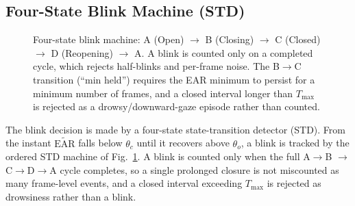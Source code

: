 \documentclass{IEEE_lsens}
\begin{document}
\subsection{Four-State Blink Machine (STD)}
\begin{figure}[!t]
\centering
{}
\caption{Four-state blink machine:
A (Open) $\rightarrow$ B (Closing) $\rightarrow$ C (Closed) $\rightarrow$
D (Reopening) $\rightarrow$ A. A blink is counted only on a completed cycle,
which rejects half-blinks and per-frame noise. The B$\rightarrow$C transition
(``min held'') requires the EAR minimum to persist for a minimum number of
frames, and a closed interval longer than $T_{\max}$ is rejected as a
drowsy/downward-gaze episode rather than counted.}
\label{fig_std}
\end{figure}
The blink decision is made by a four-state state-transition detector (STD).
From the instant $\widetilde{\mathrm{EAR}}$ falls below $\theta_c$ until it
recovers above $\theta_o$, a blink is tracked by the ordered STD machine of
Fig.~\ref{fig_std}. A blink is counted only when the full A$\rightarrow$B%
$\rightarrow$C$\rightarrow$D$\rightarrow$A cycle completes, so a single
prolonged closure is not miscounted as many frame-level events, and a closed
interval exceeding $T_{\max}$ is rejected as drowsiness rather than a blink.
\end{document}
